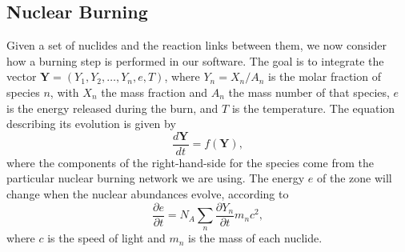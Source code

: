 \documentclass[twocolumn,numberedappendix]{../aastex6}
\begin{document}
\subsection{Nuclear Burning}
\label{sec:burner}

Given a set of nuclides and the reaction links between them, we now consider
how a burning step is performed in our software. The goal is to integrate the
vector ${\bm{Y}} = (Y_1, Y_2, \ldots, Y_n, e, T)$, where $Y_{n} = X_{n} / A_{n}$
is the molar fraction of species $n$, with $X_n$ the mass fraction and $A_n$ the
mass number of that species, $e$ is the energy released during the burn, and
$T$ is the temperature. The equation describing its evolution is given by
\begin{equation}
  \frac{d\bm{Y}}{dt} = f(\mathbf{Y}),
\end{equation}
where the components of the right-hand-side for the species come from the particular
nuclear burning network we are using. The energy $e$ of the zone
will change when the nuclear abundances evolve, according to
\begin{equation}
  \frac{\partial e}{\partial t} = N_A \sum_{n} \frac{\partial Y_{n}}{\partial t} m_{n} c^2,
\end{equation}
where $c$ is the speed of light and $m_n$ is the mass of each nuclide.
\end{document}
